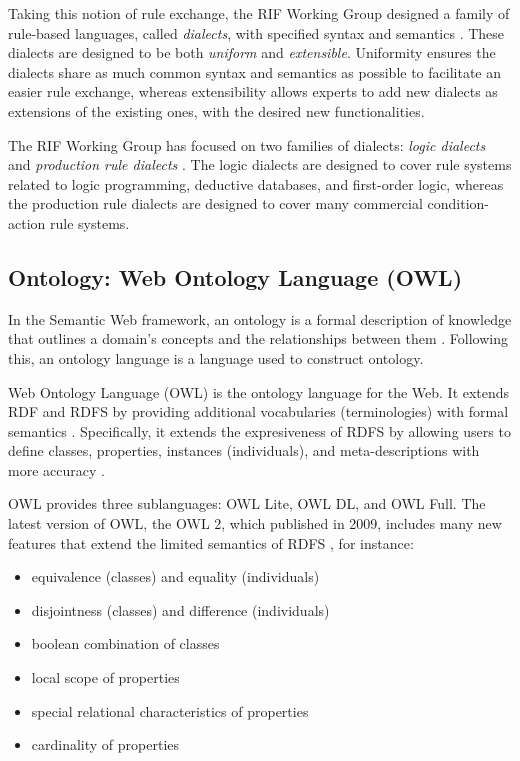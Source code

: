 Taking this notion of rule exchange, the RIF Working Group designed a family of rule-based languages, called \textit{dialects}, with specified syntax and semantics \citep{w3crif}. These dialects are designed to be both \textit{uniform} and \textit{extensible}. Uniformity ensures the dialects share as much common syntax and semantics as possible to facilitate an easier rule exchange, whereas extensibility allows experts to add new dialects as extensions of the existing ones, with the desired new functionalities.

The RIF Working Group has focused on two families of dialects: \textit{logic dialects} and \textit{production rule dialects} \citep{rifboleykifer}. The logic dialects are designed to cover rule systems related to logic programming, deductive databases, and first-order logic, whereas the production rule dialects are designed to cover many commercial condition-action rule systems.

\subsection{Ontology: Web Ontology Language (OWL)}
\label{chap2:owl}
In the Semantic Web framework, an ontology is a formal description of knowledge that outlines a domain's concepts and the relationships between them \citep{ontotext_ontologies}. Following this, an ontology language is a language used to construct ontology.

Web Ontology Language (OWL) is the ontology language for the Web. It extends RDF and RDFS by providing additional vocabularies (terminologies) with formal semantics \citep{libsw2014}. Specifically, it extends the expresiveness of RDFS by allowing users to define classes, properties, instances (individuals), and meta-descriptions with more accuracy \citep{rdf-sws}. 

OWL provides three sublanguages: OWL Lite, OWL DL, and OWL Full. The latest version of OWL, the OWL 2, which published in 2009, includes many new features that extend the limited semantics of RDFS \citep{tuominen_2020}, for instance:
\begin{itemize}[noitemsep]
    \item equivalence (classes) and equality (individuals)
    \item disjointness (classes) and difference (individuals)
    \item boolean combination of classes
    \item local scope of properties
    \item special relational characteristics of properties
    \item cardinality of properties
\end{itemize}

